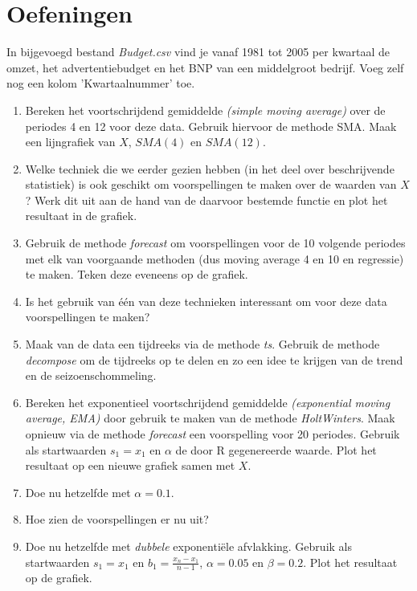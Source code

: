 \section{Oefeningen}
\label{sec:tijdreeksen-oefeningen}

\begin{exercise}
In bijgevoegd bestand \emph{Budget.csv} vind je vanaf 1981 tot 2005 per kwartaal de omzet, het advertentiebudget en het BNP van een middelgroot bedrijf. Voeg zelf nog een kolom 'Kwartaalnummer' toe.

\begin{enumerate}
  \item Bereken het voortschrijdend gemiddelde \emph{(simple moving average)} over de periodes 4 en 12 voor deze data. Gebruik hiervoor de methode SMA. Maak een lijngrafiek van $X$, $SMA(4)$ en $SMA(12)$.
  \item Welke techniek die we eerder gezien hebben (in het deel over beschrijvende statistiek) is ook geschikt om voorspellingen te maken over de waarden van $X$? Werk dit uit aan de hand van de daarvoor bestemde functie en plot het resultaat in de grafiek.
  \item Gebruik de methode \emph{forecast} om voorspellingen voor de 10 volgende periodes met elk van voorgaande methoden (dus moving average 4 en 10 en regressie) te maken. Teken deze eveneens op de grafiek.
  \item Is het gebruik van één van deze technieken interessant om voor deze data voorspellingen te maken? 
  \item Maak van de data een tijdreeks via de methode \emph{ts}. Gebruik de methode \emph{decompose} om de tijdreeks op te delen en zo een idee te krijgen van de trend en de seizoenschommeling.
  \item Bereken het exponentieel voortschrijdend gemiddelde \emph{(exponential moving average, EMA)} door gebruik te maken van de methode \emph{HoltWinters}. Maak opnieuw via de methode \emph{forecast} een voorspelling voor 20 periodes. Gebruik als startwaarden $s_1 = x_1$ en $\alpha $ de door R gegenereerde waarde. Plot het resultaat op een nieuwe grafiek samen met $X$.
  \item Doe nu hetzelfde met $\alpha=0.1$. 
  \item Hoe zien de voorspellingen er nu uit?
  \item Doe nu hetzelfde met \emph{dubbele} exponentiële afvlakking. Gebruik als startwaarden $s_1 = x_1$ en $b_1 = \frac{x_n - x_1}{n - 1}$, $\alpha =  0.05$ en $\beta = 0.2$. Plot het resultaat op de grafiek.

\end{enumerate}
\end{exercise}
